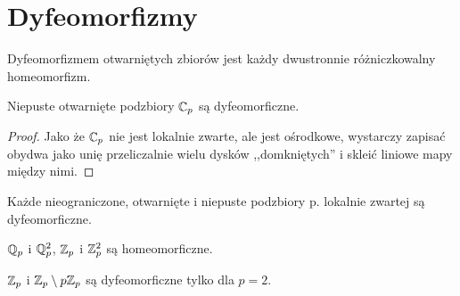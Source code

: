 \section{Dyfeomorfizmy}
\begin{definicja}
	Dyfeomorfizmem otwarniętych zbiorów jest każdy dwustronnie różniczkowalny homeomorfizm.
\end{definicja}

\begin{fakt}
	Niepuste otwarnięte podzbiory $\mathbb C_p$ są dyfeomorficzne.
\end{fakt}

\begin{proof}
	Jako że $\mathbb C_p$ nie jest lokalnie zwarte, ale jest ośrodkowe, wystarczy zapisać obydwa jako unię przeliczalnie wielu dysków ,,domkniętych'' i skleić liniowe mapy między nimi.
\end{proof}

\begin{fakt}
	Każde nieograniczone, otwarnięte i niepuste podzbiory p. lokalnie zwartej są dyfeomorficzne.
\end{fakt}

\begin{fakt}[,,Peano'']
	$\mathbb Q_p$ i $\mathbb Q_p^2$, $\mathbb Z_p$ i $\mathbb Z_p^2$ są homeomorficzne.
\end{fakt}

\begin{fakt}
	$\mathbb Z_p$ i $\mathbb Z_p \setminus p \mathbb Z_p$ są dyfeomorficzne tylko dla $p = 2$.
\end{fakt}
